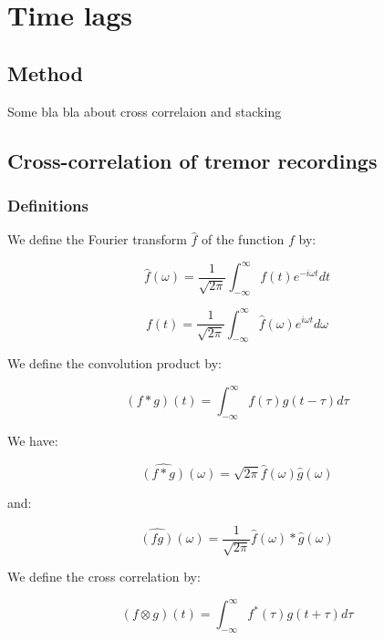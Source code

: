 \documentclass[main.tex]{subfiles}
\begin{document}
\section{Time lags}

\subsection{Method}

Some bla bla about cross correlaion and stacking

\subsection{Cross-correlation of tremor recordings}

\subsubsection{Definitions}

We define the Fourier transform $\hat{f}$ of the function $f$ by:

\begin{equation}
\hat{f} (\omega) = \frac{1}{\sqrt{2 \pi}} \int_{- \infty}^{\infty} f(t) e^{-i \omega t} dt
\end{equation}

\begin{equation}
f(t) = \frac{1}{\sqrt{2 \pi}} \int_{- \infty}^{\infty} \hat{f} (\omega) e^{i \omega t} d\omega
\end{equation}

We define the convolution product by:

\begin{equation}
(f * g) (t) = \int_{-\infty}^{\infty} f(\tau) g(t - \tau) d\tau
\end{equation}

We have:

\begin{equation}
\hat{(f * g)} (\omega) = \sqrt{2 \pi} \hat{f} (\omega) \hat{g} (\omega)
\end{equation}

and:

\begin{equation}
\hat{(f g)} (\omega) = \frac{1}{\sqrt{2 \pi}} \hat{f} (\omega) * \hat{g} (\omega)
\end{equation}

We define the cross correlation by:

\begin{equation}
(f \otimes g) (t) = \int_{- \infty}^{\infty} f^* (\tau) g(t + \tau) d\tau
\end{equation}
\end{document}
